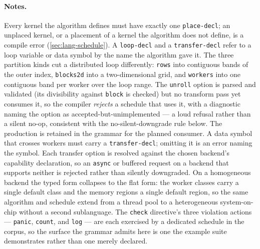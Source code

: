 \paragraph{Notes.} Every kernel the algorithm defines must have exactly one
\texttt{place-decl}; an unplaced kernel, or a placement of a kernel the algorithm
does not define, is a compile error (\cref{sec:lang-schedule}). A \texttt{loop-decl}
and a \texttt{transfer-decl} refer to a loop variable or data symbol by the name the
algorithm gave it. The three partition kinds cut a distributed loop differently:
\texttt{rows} into contiguous bands of the outer index, \texttt{blocks2d} into a
two-dimensional grid, and \texttt{workers} into one contiguous band per worker over
the loop range. The \texttt{unroll} option is parsed and validated (its
divisibility against \texttt{block} is checked) but no transform pass yet consumes
it, so the compiler \emph{rejects} a schedule that uses it, with a diagnostic naming
the option as accepted-but-unimplemented --- a loud refusal rather than a silent
no-op, consistent with the no-silent-downgrade rule below. The production is
retained in the grammar for the planned consumer. A data symbol that crosses workers must carry a
\texttt{transfer-decl}; omitting it is an error naming the symbol. Each transfer
option is resolved against the chosen backend's capability declaration, so an
\texttt{async} or buffered request on a backend that supports neither is rejected
rather than silently downgraded. On a homogeneous backend the typed form collapses
to the flat form: the worker classes carry a single default class and the memory
regions a single default region, so the same algorithm and schedule extend from a
thread pool to a heterogeneous system-on-chip without a second sublanguage. The
\texttt{check} directive's three violation actions --- \texttt{panic},
\texttt{count}, and \texttt{log} --- are each exercised by a dedicated schedule in
the corpus, so the surface the grammar admits here is one the example suite
demonstrates rather than one merely declared.
